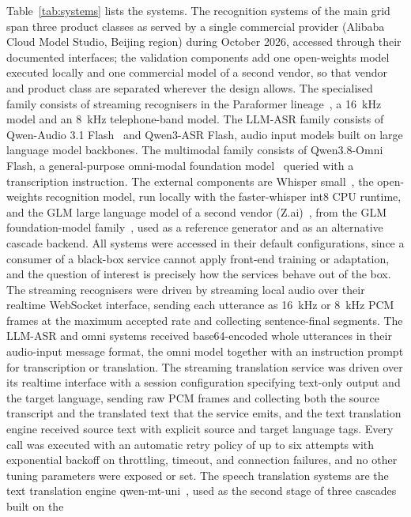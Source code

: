 Table~\ref{tab:systems} lists the systems. The recognition systems of the
main grid span
three product classes as served by a single commercial provider
(Alibaba Cloud Model Studio, Beijing region) during October 2026, accessed
through their documented interfaces; the validation components add one
open-weights model executed locally and one commercial model of a second
vendor, so that vendor and product class are separated wherever the design
allows. The specialised family consists of
streaming recognisers in the Paraformer lineage~\cite{gao2023funasr}, a
16~kHz model and an 8~kHz telephone-band model. The LLM-ASR family consists
of Qwen-Audio 3.1 Flash~\cite{chu2024qwen2audio,qwenaudio31card} and Qwen3-ASR Flash, audio
input models built on large language model backbones. The multimodal family
consists of Qwen3.8-Omni Flash, a general-purpose omni-modal foundation
model~\cite{qwen2.5omni2025,qwenomni38card} queried with a transcription instruction. The
external components are Whisper small~\cite{radford2023robust}, the
open-weights recognition model, run locally with the faster-whisper int8
CPU runtime, and the GLM large language model of a second vendor
(Z.ai)~\cite{glm2026api}, from the GLM foundation-model
family~\cite{glm2025tech}, used as a reference generator and as an
alternative cascade backend. All
systems were accessed in their default configurations, since a consumer of a
black-box service cannot apply front-end training or adaptation, and the
question of interest is precisely how the services behave out of the box.
The streaming recognisers were driven by streaming local audio over their
realtime WebSocket interface, sending each utterance as 16~kHz or 8~kHz PCM
frames at the maximum accepted rate and collecting sentence-final segments.
The LLM-ASR and omni systems received base64-encoded whole utterances in
their audio-input message format, the omni model together with an
instruction prompt for transcription or translation. The streaming
translation service was driven over its realtime interface with a session
configuration specifying text-only output and the target language, sending
raw PCM frames and collecting both the source transcript and the translated
text that the service emits, and the text translation engine received
source text with explicit source and target language tags. Every call was
executed with an automatic retry policy of up to six attempts with
exponential backoff on throttling, timeout, and connection failures, and no
other tuning parameters were exposed or set. The speech translation systems are the text translation
engine qwen-mt-uni~\cite{qwenmtcard}, used as the second stage of three cascades built on the
